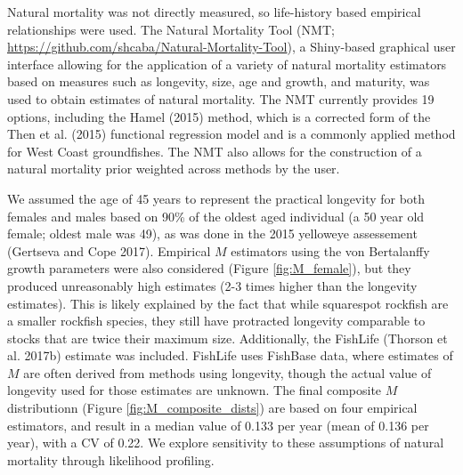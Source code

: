\documentclass[11pt,
  english,
  a4paper,
]{article}
\begin{document}
Natural mortality was not directly measured, so life-history based empirical relationships were used. The Natural Mortality Tool (NMT; {\url{https://github.com/shcaba/Natural-Mortality-Tool}\leavevmode\tagmcend\tagstructend}), a Shiny-based graphical user interface allowing for the application of a variety of natural mortality estimators based on measures such as longevity, size, age and growth, and maturity, was used to obtain estimates of natural mortality. The NMT currently provides 19 options, including the Hamel {(2015)\leavevmode\tagmcend\tagstructend} method, which is a corrected form of the Then et al. {(2015)\leavevmode\tagmcend\tagstructend} functional regression model and is a commonly applied method for West Coast groundfishes. The NMT also allows for the construction of a natural mortality prior weighted across methods by the user.

\leavevmode\tagmcend\tagstructend\par


We assumed the age of 45 years to represent the practical longevity for both females and males based on 90\% of the oldest aged individual (a 50 year old female; oldest male was 49), as was done in the 2015 yelloweye assessement {(Gertseva and Cope 2017)\leavevmode\tagmcend\tagstructend}. Empirical {\(M\)\leavevmode\tagmcend\tagstructend} estimators using the von Bertalanffy growth parameters were also considered (Figure \ref{fig:M_female}), but they produced unreasonably high estimates (2-3 times higher than the longevity estimates). This is likely explained by the fact that while squarespot rockfish are a smaller rockfish species, they still have protracted longevity comparable to stocks that are twice their maximum size. Additionally, the FishLife {(Thorson et al. 2017b)\leavevmode\tagmcend\tagstructend} estimate was included. FishLife uses FishBase data, where estimates of {\(M\)\leavevmode\tagmcend\tagstructend} are often derived from methods using longevity, though the actual value of longevity used for those estimates are unknown. The final composite {\(M\)\leavevmode\tagmcend\tagstructend} distributionn (Figure \ref{fig:M_composite_dists}) are based on four empirical estimators, and result in a median value of 0.133 per year (mean of 0.136 per year), with a CV of 0.22. We explore sensitivity to these assumptions of natural mortality through likelihood profiling.
\end{document}
